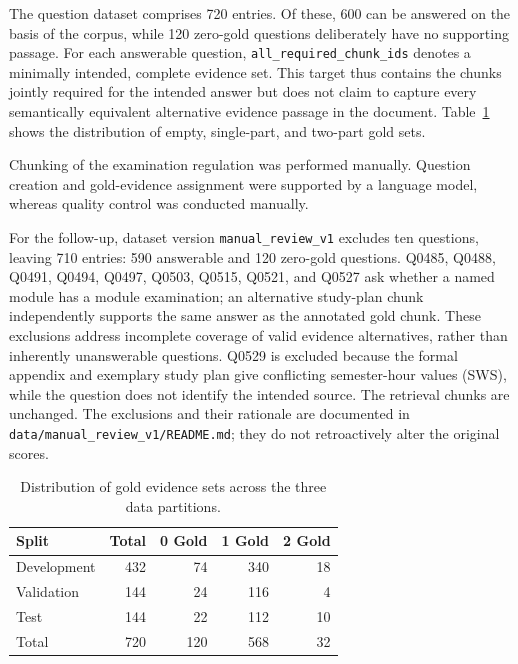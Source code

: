 \documentclass[11pt]{article}
\newcommand{\revision}[1]{#1}
\begin{document}
The question dataset comprises 720 entries. Of these, 600 can be answered on the basis of the corpus, while 120 zero-gold questions deliberately have no supporting passage. For each answerable question, \texttt{all\_required\_chunk\_ids} denotes a minimally intended, complete evidence set. This target thus contains the chunks jointly required for the intended answer but does not claim to capture every semantically equivalent alternative evidence passage in the document. Table~\ref{tab:gold-distribution} shows the distribution of empty, single-part, and two-part gold sets.

Chunking of the examination regulation was performed manually. Question creation and gold-evidence assignment were supported by a language model, whereas quality control was conducted manually.

\revision{For the follow-up, dataset version \texttt{manual\_review\_v1} excludes ten questions, leaving 710 entries: 590 answerable and 120 zero-gold questions. Q0485, Q0488, Q0491, Q0494, Q0497, Q0503, Q0515, Q0521, and Q0527 ask whether a named module has a module examination; an alternative study-plan chunk independently supports the same answer as the annotated gold chunk. These exclusions address incomplete coverage of valid evidence alternatives, rather than inherently unanswerable questions. Q0529 is excluded because the formal appendix and exemplary study plan give conflicting semester-hour values (SWS), while the question does not identify the intended source. The retrieval chunks are unchanged. The exclusions and their rationale are documented in \nolinkurl{data/manual_review_v1/README.md}; they do not retroactively alter the original scores.}

\begin{table}[t]
\centering
\small
\begin{tabular}{lrrrr}
\toprule
\textbf{Split} & \textbf{Total} & \textbf{0 Gold} & \textbf{1 Gold} & \textbf{2 Gold} \\
\midrule
Development & 432 & 74 & 340 & 18 \\
Validation & 144 & 24 & 116 & 4 \\
Test         & 144 & 22 & 112 & 10 \\
\midrule
Total       & 720 & 120 & 568 & 32 \\
\bottomrule
\end{tabular}
\caption{Distribution of gold evidence sets across the three data partitions.}
\label{tab:gold-distribution}
\end{table}
\end{document}
